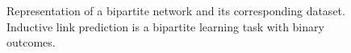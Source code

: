 \documentclass[sn-mathphys-num]{sn-jnl}%
\newcommand{\x}{\mathbf{x}}
\newcommand{\y}{\mathbf{y}}
\theoremstyle{thmstyleone}%
\theoremstyle{thmstyletwo}%
\theoremstyle{thmstylethree}%
\begin{document}
%

%
%

\begin{figure}[bt]
    \centering
    \def\svgscale{.3}
    
    \caption{Representation of a bipartite network and its corresponding dataset. Inductive link prediction is a bipartite learning task with binary outcomes.}
    \label{fig:bipartite dataset}
\end{figure}

%     

%     
\end{document}

